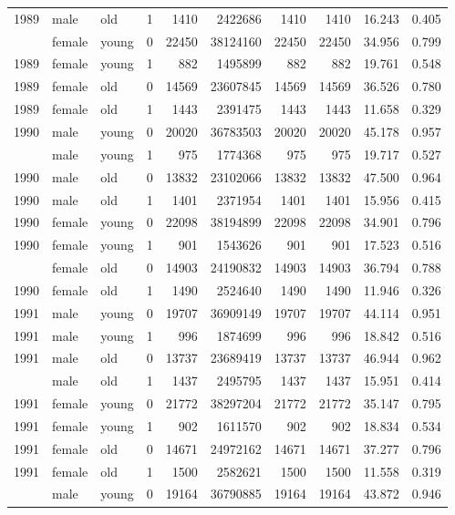 \begin{table}
\begin{tabular}[t]{rllrrrrrrr}
1989 & male & old & 1 & 1410 & 2422686 & 1410 & 1410 & 16.243 & 0.405\\
\addlinespace
1989 & female & young & 0 & 22450 & 38124160 & 22450 & 22450 & 34.956 & 0.799\\
1989 & female & young & 1 & 882 & 1495899 & 882 & 882 & 19.761 & 0.548\\
1989 & female & old & 0 & 14569 & 23607845 & 14569 & 14569 & 36.526 & 0.780\\
1989 & female & old & 1 & 1443 & 2391475 & 1443 & 1443 & 11.658 & 0.329\\
1990 & male & young & 0 & 20020 & 36783503 & 20020 & 20020 & 45.178 & 0.957\\
\addlinespace
1990 & male & young & 1 & 975 & 1774368 & 975 & 975 & 19.717 & 0.527\\
1990 & male & old & 0 & 13832 & 23102066 & 13832 & 13832 & 47.500 & 0.964\\
1990 & male & old & 1 & 1401 & 2371954 & 1401 & 1401 & 15.956 & 0.415\\
1990 & female & young & 0 & 22098 & 38194899 & 22098 & 22098 & 34.901 & 0.796\\
1990 & female & young & 1 & 901 & 1543626 & 901 & 901 & 17.523 & 0.516\\
\addlinespace
1990 & female & old & 0 & 14903 & 24190832 & 14903 & 14903 & 36.794 & 0.788\\
1990 & female & old & 1 & 1490 & 2524640 & 1490 & 1490 & 11.946 & 0.326\\
1991 & male & young & 0 & 19707 & 36909149 & 19707 & 19707 & 44.114 & 0.951\\
1991 & male & young & 1 & 996 & 1874699 & 996 & 996 & 18.842 & 0.516\\
1991 & male & old & 0 & 13737 & 23689419 & 13737 & 13737 & 46.944 & 0.962\\
\addlinespace
1991 & male & old & 1 & 1437 & 2495795 & 1437 & 1437 & 15.951 & 0.414\\
1991 & female & young & 0 & 21772 & 38297204 & 21772 & 21772 & 35.147 & 0.795\\
1991 & female & young & 1 & 902 & 1611570 & 902 & 902 & 18.834 & 0.534\\
1991 & female & old & 0 & 14671 & 24972162 & 14671 & 14671 & 37.277 & 0.796\\
1991 & female & old & 1 & 1500 & 2582621 & 1500 & 1500 & 11.558 & 0.319\\
\addlinespace
1992 & male & young & 0 & 19164 & 36790885 & 19164 & 19164 & 43.872 & 0.946\\

\end{tabular}
\end{table}

